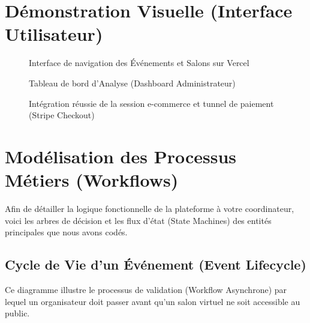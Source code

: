\documentclass[12pt,a4paper]{article}
\begin{document}
\section{Démonstration Visuelle (Interface Utilisateur)}

\begin{figure}[h]
    \centering
    \vspace{4cm} %
    \caption{Interface de navigation des Événements et Salons sur Vercel}
\end{figure}

\begin{figure}[h]
    \centering
    \vspace{4cm}
    \caption{Tableau de bord d'Analyse (Dashboard Administrateur)}
\end{figure}

\begin{figure}[h]
    \centering
    \vspace{4cm}
    \caption{Intégration réussie de la session e-commerce et tunnel de paiement (Stripe Checkout)}
\end{figure}

\section{Modélisation des Processus Métiers (Workflows)}
Afin de détailler la logique fonctionnelle de la plateforme à votre coordinateur, voici les arbres de décision et les flux d'état (State Machines) des entités principales que nous avons codés.

\subsection{Cycle de Vie d'un Événement (Event Lifecycle)}
Ce diagramme illustre le processus de validation (Workflow Asynchrone) par lequel un organisateur doit passer avant qu'un salon virtuel ne soit accessible au public.
\end{document}
